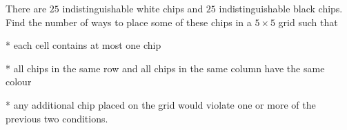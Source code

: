 There are $25$ indistinguishable white chips and $25$ indistinguishable black chips. Find the number of ways to place some of these chips in a $5 \times 5$ grid such that

* each cell contains at most one chip

* all chips in the same row and all chips in the same column have the same colour

* any additional chip placed on the grid would violate one or more of the previous two conditions.
